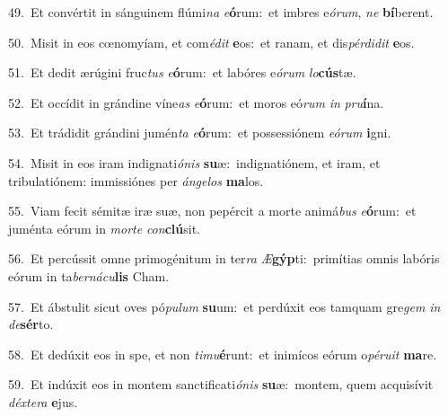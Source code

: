 {\numbfont\textcolor{\numbcolor}{49.}}~Et convértit in sánguinem flúmi\textit{na} \textit{e}\-\textbf{ó}rum:~\star et imbres e\-\textit{ó}\-\textit{rum}, \textit{ne} \textbf{bí}\-berent.\par
{\numbfont\textcolor{\numbcolor}{50.}}~Misit in eos cœnomyíam, et com\-\textit{é}\-\textit{dit} \textbf{e}\-os:~\star et ranam, et dis\-\textit{pér}\-\textit{di}\textit{dit} \textbf{e}\-os.\par
{\numbfont\textcolor{\numbcolor}{51.}}~Et dedit ærúgini fruc\textit{tus} \textit{e}\-\textbf{ó}rum:~\star et labóres e\-\textit{ó}\-\textit{rum} \textit{lo}\-\textbf{cús}tæ.\par
{\numbfont\textcolor{\numbcolor}{52.}}~Et occídit in grándine víne\textit{as} \textit{e}\-\textbf{ó}rum:~\star et moros eó\textit{rum} \textit{in} \textit{pru}\-\textbf{í}na.\par
{\numbfont\textcolor{\numbcolor}{53.}}~Et trádidit grándini jumén\textit{ta} \textit{e}\-\textbf{ó}rum:~\star et possessiónem \textit{e}\-\textit{ó}\textit{rum} \textbf{i}\-gni.\par
{\numbfont\textcolor{\numbcolor}{54.}}~Misit in eos iram indignati\-\textit{ó}\-\textit{nis} \textbf{su}\-æ:~\star indignatiónem, et iram, et tribulatiónem: immissiónes per \textit{án}\-\textit{ge}\textit{los} \textbf{ma}\-los.\par
{\numbfont\textcolor{\numbcolor}{55.}}~Viam fecit sémitæ iræ suæ, non pepércit a morte animá\textit{bus} \textit{e}\-\textbf{ó}rum:~\star et juménta eórum in \textit{mor}\-\textit{te} \textit{con}\-\textbf{clú}sit.\par
{\numbfont\textcolor{\numbcolor}{56.}}~Et percússit omne primogénitum in ter\textit{ra} \textit{Æ}\-\textbf{gýp}ti:~\star primítias omnis labóris eórum in ta\-\textit{ber}\-\textit{ná}\textit{cu}\textbf{lis} Cham.\par
{\numbfont\textcolor{\numbcolor}{57.}}~Et ábstulit sicut oves pó\-\textit{pu}\-\textit{lum} \textbf{su}\-um:~\star et perdúxit eos tamquam gre\textit{gem} \textit{in} \textit{de}\-\textbf{sér}to.\par
{\numbfont\textcolor{\numbcolor}{58.}}~Et dedúxit eos in spe, et non \textit{ti}\-\textit{mu}\textbf{é}runt:~\star et inimícos eórum o\-\textit{pé}\-\textit{ru}\textit{it} \textbf{ma}\-re.\par
{\numbfont\textcolor{\numbcolor}{59.}}~Et indúxit eos in montem sanctificati\-\textit{ó}\-\textit{nis} \textbf{su}\-æ:~\star montem, quem acquisívit \textit{déx}\-\textit{te}\textit{ra} \textbf{e}\-jus.\par
